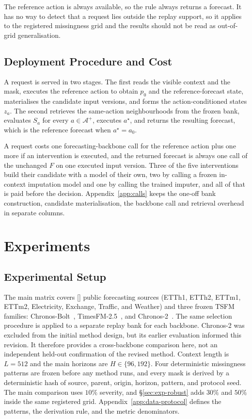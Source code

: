 \documentclass{article}
\newcommand{\ph}[1]{\textcolor{phgray}{\textsf{[\detokenize{#1}]}}}
\newcommand{\tsfm}{TSFM}
\newcommand{\calA}{\mathcal{A}}
\begin{document}
The reference action is always available, so the rule always returns a forecast. It has no way
to detect that a request lies outside the replay support, so it applies to the registered
missingness grid and the results should not be read as out-of-grid generalisation.

\subsection{Deployment Procedure and Cost}
\label{sec:method-deploy}
A request is served in two stages. The first reads the visible context and the mask, executes
the reference action to obtain $p_0$ and the reference-forecast state, materialises the
candidate input versions, and forms the action-conditioned states $z_a$. The second retrieves
the same-action neighbourhoods from the frozen bank, evaluates $S_a$ for every
$a \in \calA^{+}$, executes $a^{\star}$, and returns the resulting forecast, which is the
reference forecast when $a^{\star} = a_0$.

A request costs one forecasting-backbone call for the reference action plus one more if an
intervention is executed, and the returned forecast is always one call of the unchanged $F$ on
one executed input version. Three of the five interventions build their candidate with a model
of their own, two by calling a frozen in-context imputation model and one by calling the
trained imputer, and all of that is paid before the decision.
Appendix~\ref{app:calls} keeps the one-off bank construction, candidate materialisation, the
backbone call and retrieval overhead in separate columns.

\section{Experiments}
\label{sec:exp}

\subsection{Experimental Setup}
\label{sec:exp-setup}
The main matrix covers \ph{N_DATASETS} public forecasting sources (ETTh1, ETTh2, ETTm1, ETTm2,
Electricity, Exchange, Traffic, and Weather) and three frozen \tsfm{} families:
Chronos-Bolt~\citep{chronosbolt2025}, TimesFM-2.5~\citep{das2024timesfm}, and
Chronos-2~\citep{chronos2_2025}. The same selection procedure is applied to a separate replay
bank for each backbone. Chronos-2 was excluded from the initial method design, but its earlier
evaluation informed this revision. It therefore provides a cross-backbone comparison here,
not an independent held-out confirmation of the revised method.
Context length is $L = 512$ and the main horizons are $H \in \{96, 192\}$. Four deterministic
missingness patterns are frozen before any method runs, and every mask is derived by a
deterministic hash of source, parent, origin, horizon, pattern, and protocol seed. The main
comparison uses $10\%$ severity, and \S\ref{sec:exp-robust} adds $30\%$ and $50\%$ inside the
same registered grid. Appendix~\ref{app:data-protocol} defines the patterns, the derivation
rule, and the metric denominators.
\end{document}

